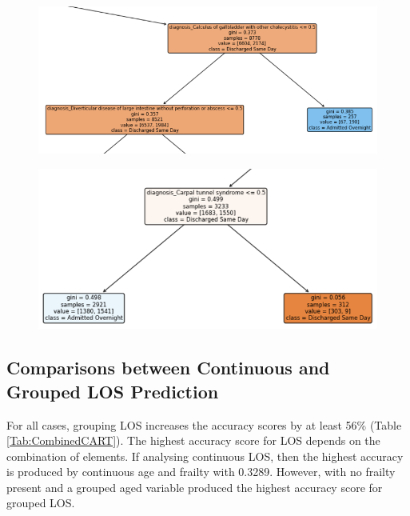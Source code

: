 \documentclass[../thesis.tex]{subfiles}
\begin{document}
\begin{figure}[h!]
\centering
\begin{minipage}{.5\textwidth}
  \centering
  \includegraphics[width=1\linewidth]{Chapter4/Figures/FIGX1a.png}
  \label{Fig:Split1}
\end{minipage}%
\begin{minipage}{.5\textwidth}
  \centering
  \includegraphics[width=0.9\linewidth]{Chapter4/Figures/FIGX1b.png}
  \label{Fig:Split2}
\end{minipage}
\end{figure}

\subsection{Comparisons between Continuous and Grouped LOS Prediction}
For all cases, grouping LOS increases the accuracy scores by at least 56\% (Table \ref{Tab:CombinedCART}). The highest accuracy score for LOS depends on the combination of elements. If analysing continuous LOS, then the highest accuracy is produced by continuous age and frailty with 0.3289. However, with no frailty present and a grouped aged variable produced the highest accuracy score for grouped LOS. 
\end{document}
